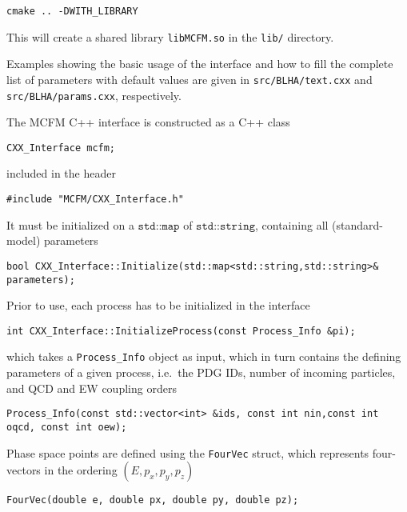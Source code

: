 \begin{verbatim}
cmake .. -DWITH_LIBRARY
\end{verbatim}

This will create a shared library {\verb!libMCFM.so!}
in the {\verb!lib/!} directory.

\hypertarget{usage}{%
\label{usage}}

Examples showing the basic usage of the interface and how to fill the
complete list of parameters with default values are given in
{\verb!src/BLHA/text.cxx!} and
{\verb!src/BLHA/params.cxx!}, respectively.

The MCFM C++ interface is constructed as a C++ class

\begin{verbatim}
CXX_Interface mcfm;
\end{verbatim}

included in the header

\begin{verbatim}
#include "MCFM/CXX_Interface.h"
\end{verbatim}

It must be initialized on a \(\texttt{std::map}\) of
\(\texttt{std::string}\), containing all (standard-model) parameters

\begin{verbatim}
bool CXX_Interface::Initialize(std::map<std::string,std::string>& parameters);
\end{verbatim}

Prior to use, each process has to be initialized in the interface

\begin{verbatim}
int CXX_Interface::InitializeProcess(const Process_Info &pi);
\end{verbatim}

which takes a {\verb!Process_Info!} object as input,
which in turn contains the defining parameters of a given process,
i.e.~the PDG IDs, number of incoming particles, and QCD and EW coupling
orders

\begin{verbatim}
Process_Info(const std::vector<int> &ids, const int nin,const int oqcd, const int oew);
\end{verbatim}

Phase space points are defined using the
{\verb!FourVec!} struct, which represents four-vectors
in the ordering \((E, p_x, p_y, p_z)\)

\begin{verbatim}
FourVec(double e, double px, double py, double pz);
\end{verbatim}

